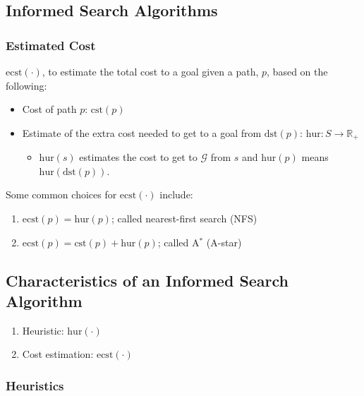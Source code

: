 \subsection{Informed Search Algorithms}
\subsubsection{Estimated Cost}
\begin{definition}
    $\text{ecst}(\cdot)$, to estimate the total cost to a goal given a path, $p$, based on the following:
    \begin{itemize}
        \item Cost of path $p$: $\text{cst}(p)$
        \item Estimate of the extra cost needed to get to a goal from $\text{dst}(p)$: $\text{hur} : S \to \mathbb{R}_+$
        \begin{itemize}
            \item $\text{hur}(s)$ estimates the cost to get to $\mathcal{G}$ from $s$ and $\text{hur}(p)$ means $\text{hur}(\text{dst}(p))$.
        \end{itemize}
    \end{itemize}
\end{definition}

\begin{example}
    Some common choices for $\text{ecst}(\cdot)$ include:
    \begin{enumerate}
        \item $\text{ecst}(p) = \text{hur}(p)$; called nearest-first search (NFS)
        \item $\text{ecst}(p) = \text{cst}(p) + \text{hur}(p)$; called A$^*$ (A-star)
    \end{enumerate}
\end{example}

\subsection{Characteristics of an Informed Search Algorithm}
\begin{definition}
    \begin{enumerate}
        \item Heuristic: $\text{hur}(\cdot)$
        \item Cost estimation: $\text{ecst}(\cdot)$
    \end{enumerate}
\end{definition}

\subsubsection{Heuristics}

